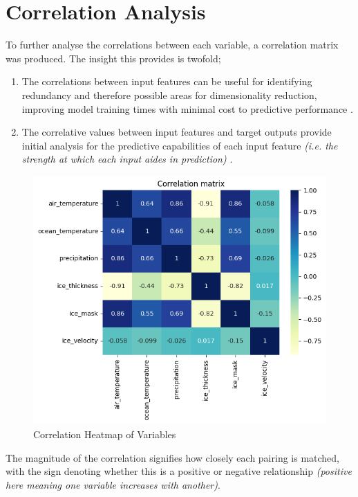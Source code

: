 \section{Correlation Analysis}\label{SS:correlation_analysis}
To further analyse the correlations between each variable, a correlation matrix was produced. The insight this provides is twofold; 

\begin{enumerate}
    \item  The correlations between input features can be useful for identifying redundancy and therefore possible areas for dimensionality reduction, improving model training times with minimal cost to predictive performance \cite{Rovira2022}.
    \item The correlative values between input features and target outputs provide initial analysis for the predictive capabilities of each input feature \textit{(i.e. the strength at which each input aides in prediction)} \cite{Hall2000}.
\end{enumerate}


\begin{figure}[H]
  \centering
  \includegraphics[width=1\textwidth]{images/correlations.png}
  \caption{Correlation Heatmap of Variables}
  \label{fig:correlations}
\end{figure}
The magnitude of the correlation signifies how closely each pairing is matched, with the sign denoting whether this is a positive or negative relationship \textit{(positive here meaning one variable increases with another)}.

